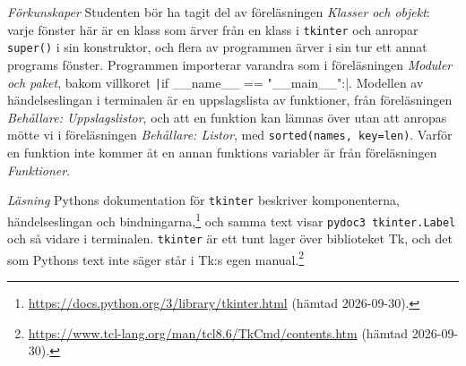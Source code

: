 \emph{Förkunskaper}
Studenten bör ha tagit del av föreläsningen \emph{Klasser och objekt}:
varje fönster här är en klass som ärver från en klass i
\texttt{tkinter} och anropar \texttt{super()} i
sin konstruktor, och flera av programmen ärver i sin tur ett annat
programs fönster.  Programmen importerar varandra som i föreläsningen
\emph{Moduler och paket}, bakom villkoret
\texttt|if __name__ == "__main__":|.  Modellen av
händelseslingan i terminalen är en uppslagslista av funktioner, från
föreläsningen \emph{Behållare: Uppslagslistor}, och att en funktion kan
lämnas över utan att anropas mötte vi i föreläsningen \emph{Behållare:
Listor}, med \texttt{sorted(names, key=len)}.  Varför en
funktion inte kommer åt en annan funktions variabler är från
föreläsningen \emph{Funktioner}.

\emph{Läsning}
Pythons dokumentation för \texttt{tkinter} beskriver
komponenterna, händelseslingan och bindningarna,\footnote{%
  \url{https://docs.python.org/3/library/tkinter.html} (hämtad
  2026-09-30).}
och samma text visar \texttt{pydoc3 tkinter.Label} och så vidare i
terminalen.  \texttt{tkinter} är ett tunt lager över
biblioteket Tk, och det som Pythons text inte säger står i Tk:s egen
manual.\footnote{%
  \url{https://www.tcl-lang.org/man/tcl8.6/TkCmd/contents.htm} (hämtad
  2026-09-30).}
